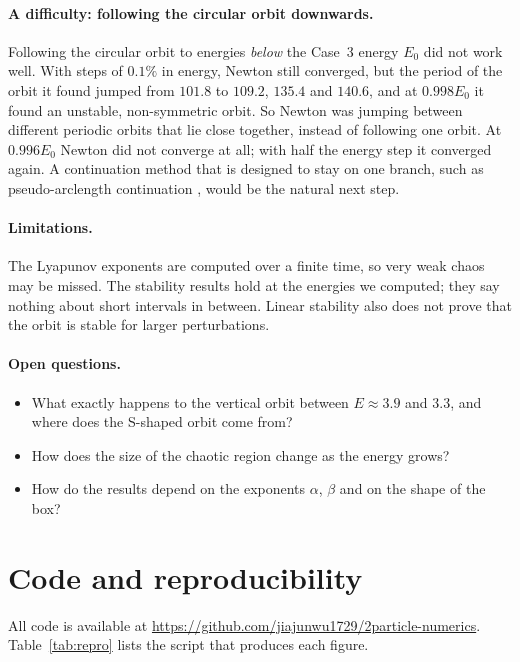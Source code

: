 \documentclass[11pt,a4paper]{article}
\begin{document}
\paragraph{A difficulty: following the circular orbit downwards.}
Following the circular orbit to energies \emph{below} the Case~3 energy $E_0$
did not work well. With steps of $0.1\%$ in energy, Newton still converged,
but the period of the orbit it found jumped from $101.8$ to $109.2$, $135.4$
and $140.6$, and at $0.998E_0$ it found an unstable, non-symmetric orbit. So
Newton was jumping between different periodic orbits that lie close together,
instead of following one orbit. At $0.996E_0$ Newton did not converge at all;
with half the energy step it converged again. A continuation method that is
designed to stay on one branch, such as pseudo-arclength continuation
\cite{kuznetsov}, would be the natural next step.

\paragraph{Limitations.}
The Lyapunov exponents are computed over a finite time, so very weak chaos
may be missed. The stability results hold at the energies we computed; they
say nothing about short intervals in between. Linear stability also does not
prove that the orbit is stable for larger perturbations.

\paragraph{Open questions.}
\begin{itemize}
  \item What exactly happens to the vertical orbit between $E\approx3.9$ and
        $3.3$, and where does the S-shaped orbit come from?
  \item How does the size of the chaotic region change as the energy grows?
  \item How do the results depend on the exponents $\alpha$, $\beta$ and on the
        shape of the box?
\end{itemize}

\section*{Code and reproducibility}
All code is available at
\url{https://github.com/jiajunwu1729/2particle-numerics}. Table~\ref{tab:repro} lists the
script that produces each figure.
\end{document}
